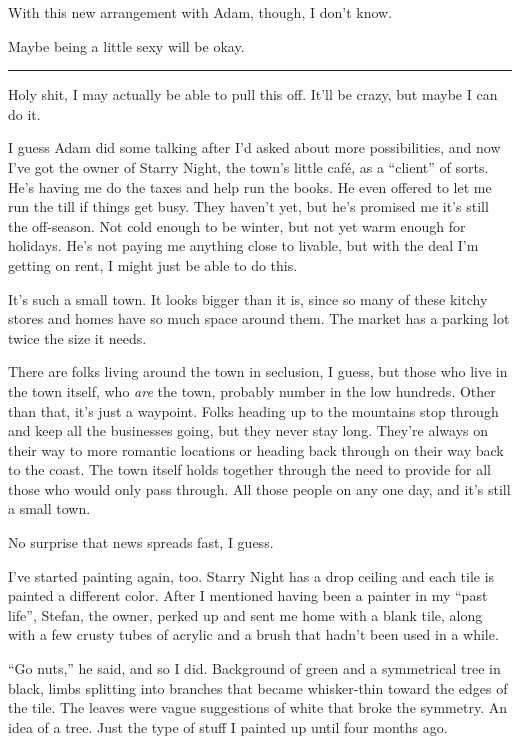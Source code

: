 With this new arrangement with Adam, though, I don't know.

Maybe being a little sexy will be okay.

\begin{center}\rule{0.5\linewidth}{\linethickness}\end{center}

Holy shit, I may actually be able to pull this off. It'll be crazy, but maybe I can do it.

I guess Adam did some talking after I'd asked about more possibilities, and now I've got the owner of Starry Night, the town's little café, as a ``client'' of sorts. He's having me do the taxes and help run the books. He even offered to let me run the till if things get busy. They haven't yet, but he's promised me it's still the off-season. Not cold enough to be winter, but not yet warm enough for holidays. He's not paying me anything close to livable, but with the deal I'm getting on rent, I might just be able to do this.

It's such a small town. It looks bigger than it is, since so many of these kitchy stores and homes have so much space around them. The market has a parking lot twice the size it needs.

There are folks living around the town in seclusion, I guess, but those who live in the town itself, who \emph{are} the town, probably number in the low hundreds. Other than that, it's just a waypoint. Folks heading up to the mountains stop through and keep all the businesses going, but they never stay long. They're always on their way to more romantic locations or heading back through on their way back to the coast. The town itself holds together through the need to provide for all those who would only pass through. All those people on any one day, and it's still a small town.

No surprise that news spreads fast, I guess.

I've started painting again, too. Starry Night has a drop ceiling and each tile is painted a different color. After I mentioned having been a painter in my ``past life'', Stefan, the owner, perked up and sent me home with a blank tile, along with a few crusty tubes of acrylic and a brush that hadn't been used in a while.

``Go nuts,'' he said, and so I did. Background of green and a symmetrical tree in black, limbs splitting into branches that became whisker-thin toward the edges of the tile. The leaves were vague suggestions of white that broke the symmetry. An idea of a tree. Just the type of stuff I painted up until four months ago.

